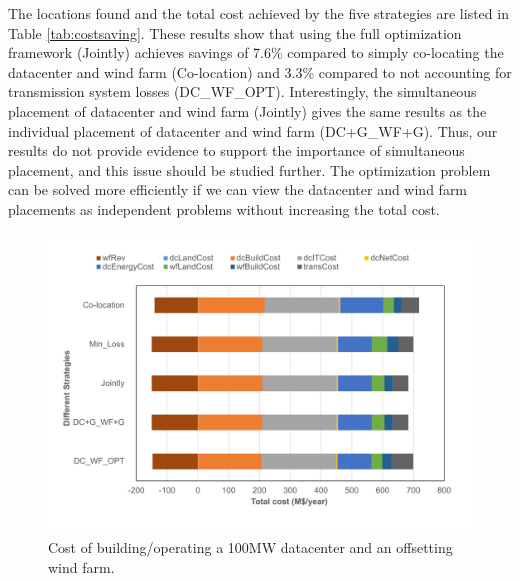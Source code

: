 The locations found and the total cost achieved by the five strategies
are listed in Table \ref{tab:costsaving}.  These results show that
using the full optimization framework (Jointly) achieves savings of
7.6\% compared to simply co-locating the datacenter and wind farm
(Co-location) and 3.3\% compared to not accounting for transmission
system losses (DC\_WF\_OPT).  Interestingly, the simultaneous
placement of datacenter and wind farm (Jointly) gives the same results
as the individual placement of datacenter and wind farm (DC+G\_WF+G).
Thus, our results do not provide evidence to support the importance of
simultaneous placement, and this issue should be studied further.  The
optimization problem can be solved more efficiently if we can view the
datacenter and wind farm placements as independent problems without
increasing the total cost.

\begin{figure}[ht]
\centering
\includegraphics[width=1\columnwidth]{img/cost-one-dc-one-wf}
\caption{Cost of building/operating a 100MW datacenter and an offsetting wind farm.}
\label{fig:cost1dc1wf}
\end{figure}

